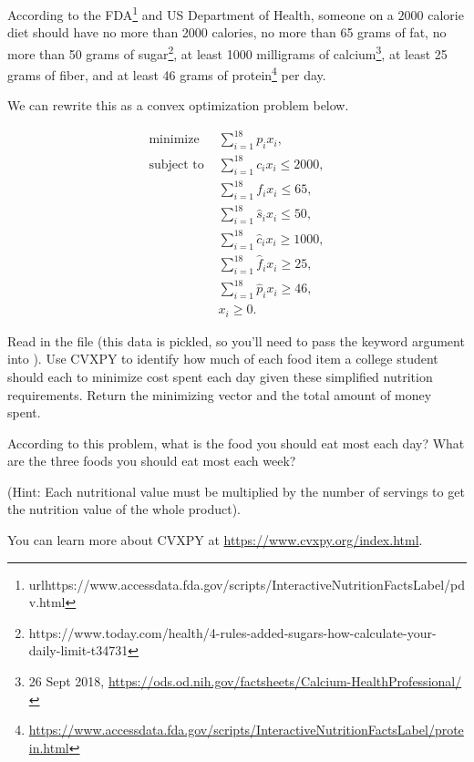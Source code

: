  According to the FDA\footnote[1]{url{https://www.accessdata.fda.gov/scripts/InteractiveNutritionFactsLabel/pdv.html}} and US Department of Health, someone on a $2000$ calorie diet should have no more than 2000 calories, no more than 65 grams of fat, no more than 50 grams of sugar\footnote[2]{https://www.today.com/health/4-rules-added-sugars-how-calculate-your-daily-limit-t34731}, at least 1000 milligrams of calcium\footnote[1]{26 Sept 2018, \url{https://ods.od.nih.gov/factsheets/Calcium-HealthProfessional/}}, at least 25 grams of fiber, and at least 46 grams of protein\footnote[2]{\url{https://www.accessdata.fda.gov/scripts/InteractiveNutritionFactsLabel/protein.html}} per day.

 We can rewrite this as a convex optimization problem below.

 \begin{align*}
\text{minimize } & \sum_{i=1}^{18}p_ix_i, \\
\text{subject to }& \sum_{i=1}^{18} c_ix_i \leq 2000, \\
			& \sum_{i=1}^{18} f_ix_i \leq 65, \\
			& \sum_{i=1}^{18} \hat{s}_ix_i \leq 50, \\
			& \sum_{i=1}^{18} \hat{c}_ix_i \geq 1000, \\
			& \sum_{i=1}^{18} \hat{f}_ix_i \geq 25, \\
			& \sum_{i=1}^{18} \hat{p}_ix_i \geq 46, \\
			& x_i \geq 0.
\end{align*}

 \begin{problem}
Read in the file  (this data is pickled, so you'll need to pass the keyword argument  into ).
Use CVXPY to identify how much of each food item a college student should each to minimize cost spent each day given these simplified nutrition requirements.
Return the minimizing vector and the total amount of money spent.

According to this problem, what is the food you should eat most each day? 
What are the three foods you should eat most each week?

(Hint: Each nutritional value must be multiplied by the number of servings to get the nutrition value of the whole product).
\label{prob:diet}
\end{problem}

You can learn more about CVXPY at
\url{https://www.cvxpy.org/index.html}.

